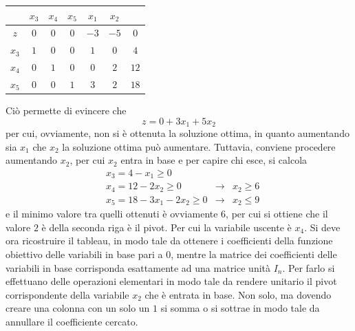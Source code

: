 \documentclass[a4paper]{extarticle}
\renewcommand\arraystretch{}
\begin{document}
\begin{table}[H]
    \setlength{\tabcolsep}{4pt}
    \renewcommand{\arraystretch}{2.2}
    \noindent
    \centering
    \begin{tabular}{|c|ccc|cc|c|}
        & $x_3$ & $x_4$ & $x_5$ & $x_1$ & $x_2$ &\\
        \hline
        $z$ & $0$ & $0$ & $0$ & $-3$ & $-5$ & $0$\\
        \hline
        $x_3$ & \cellcolor{red!50!white}$1$ & \cellcolor{red!50!white}$0$ & \cellcolor{red!50!white}$0$ & \cellcolor{blue!50!white}$1$ & \cellcolor{blue!50!white}$0$ & \cellcolor{orange!25!white}$4$\\
        $x_4$ & \cellcolor{red!50!white}$0$ & \cellcolor{red!50!white}$1$ & \cellcolor{red!50!white}$0$ & \cellcolor{blue!50!white}$0$ & \cellcolor{blue!50!white}$2$ & \cellcolor{orange!25!white}$12$\\
        $x_5$ & \cellcolor{red!50!white}$0$ & \cellcolor{red!50!white}$0$ & \cellcolor{red!50!white}$1$ & \cellcolor{blue!50!white}$3$ & \cellcolor{blue!50!white}$2$ & \cellcolor{orange!25!white}$18$\\
        \hline
    \end{tabular}
\end{table}
Ciò permette di evincere che
\[z=0+3x_1+5x_2\]
per cui, ovviamente, non si è ottenuta la soluzione ottima, in quanto aumentando sia $x_1$ che $x_2$ la soluzione ottima può aumentare. Tuttavia, conviene procedere aumentando $x_2$, per cui $x_2$ entra in base e per capire chi esce, si calcola
\begin{align*}
    &x_3=4-x_1 \geq 0\\
    &x_4=12-2x_2 \geq 0 & \rightarrow & x_2 \geq 6\\
    &x_5=18-3x_1-2x_2 \geq 0 & \rightarrow & x_2 \leq 9
\end{align*}
e il minimo valore tra quelli ottenuti è ovviamente $6$, per cui si ottiene che il valore $2$ è della seconda riga è il pivot. Per cui la variabile uscente è $x_4$. Si deve ora ricostruire il tableau, in modo tale da ottenere i coefficienti della funzione obiettivo delle variabili in base pari a $0$, mentre la matrice dei coefficienti delle variabili in base corrisponda esattamente ad una matrice unità $I_n$. Per farlo si effettuano delle operazioni elementari in modo tale da rendere unitario il pivot corrispondente della variabile $x_2$ che è entrata in base. Non solo, ma dovendo creare una colonna con un solo un $1$ si somma o si sottrae in modo tale da annullare il coefficiente cercato.\\
\end{document}
